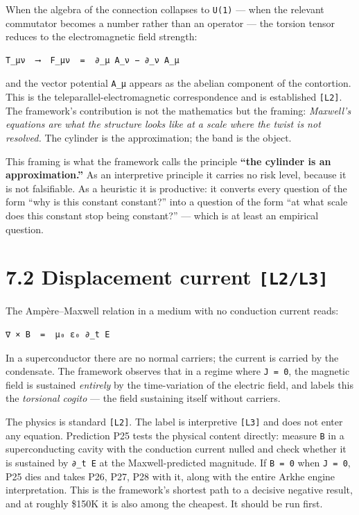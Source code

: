 \documentclass[
  11pt]{report}
\begin{document}
When the algebra of the connection collapses to \texttt{U(1)} --- when
the relevant commutator becomes a number rather than an operator --- the
torsion tensor reduces to the electromagnetic field strength:

\begin{verbatim}
T_μν  ⟶  F_μν  =  ∂_μ A_ν − ∂_ν A_μ
\end{verbatim}

and the vector potential \texttt{A\_μ} appears as the abelian component
of the contortion. This is the teleparallel-electromagnetic
correspondence and is established \texttt{{[}L2{]}}. The framework's
contribution is not the mathematics but the framing: \emph{Maxwell's
equations are what the structure looks like at a scale where the twist
is not resolved.} The cylinder is the approximation; the band is the
object.

This framing is what the framework calls the principle \textbf{``the
cylinder is an approximation.''} As an interpretive principle it carries
no risk level, because it is not falsifiable. As a heuristic it is
productive: it converts every question of the form ``why is this
constant constant?'' into a question of the form ``at what scale does
this constant stop being constant?'' --- which is at least an empirical
question.

\hypertarget{displacement-current-l2l3}{%
\section{\texorpdfstring{7.2 Displacement current
\texttt{{[}L2/L3{]}}}{7.2 Displacement current {[}L2/L3{]}}}\label{displacement-current-l2l3}}

The Ampère--Maxwell relation in a medium with no conduction current
reads:

\begin{verbatim}
∇ × B  =  μ₀ ε₀ ∂_t E
\end{verbatim}

In a superconductor there are no normal carriers; the current is carried
by the condensate. The framework observes that in a regime where
\texttt{J\ =\ 0}, the magnetic field is sustained \emph{entirely} by the
time-variation of the electric field, and labels this the
\emph{torsional cogito} --- the field sustaining itself without
carriers.

The physics is standard \texttt{{[}L2{]}}. The label is interpretive
\texttt{{[}L3{]}} and does not enter any equation. Prediction P25 tests
the physical content directly: measure \texttt{B} in a superconducting
cavity with the conduction current nulled and check whether it is
sustained by \texttt{∂\_t\ E} at the Maxwell-predicted magnitude. If
\texttt{B\ =\ 0} when \texttt{J\ =\ 0}, P25 dies and takes P26, P27, P28
with it, along with the entire Arkhe engine interpretation. This is the
framework's shortest path to a decisive negative result, and at roughly
\$150K it is also among the cheapest. It should be run first.
\end{document}
